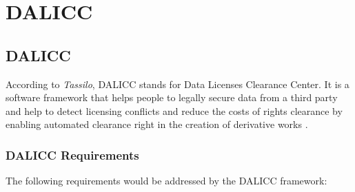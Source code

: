 \chapter{DALICC}
\section{DALICC}
According to \textit{Tassilo}, DALICC stands for Data Licenses Clearance Center. It is a software framework that helps people to legally secure data from a third party and help to detect licensing conflicts and reduce the costs of rights clearance by enabling automated clearance right in the creation of derivative works \cite{Tassilo}. 
\subsection{DALICC Requirements}
The following requirements would be addressed by the DALICC framework:\\
